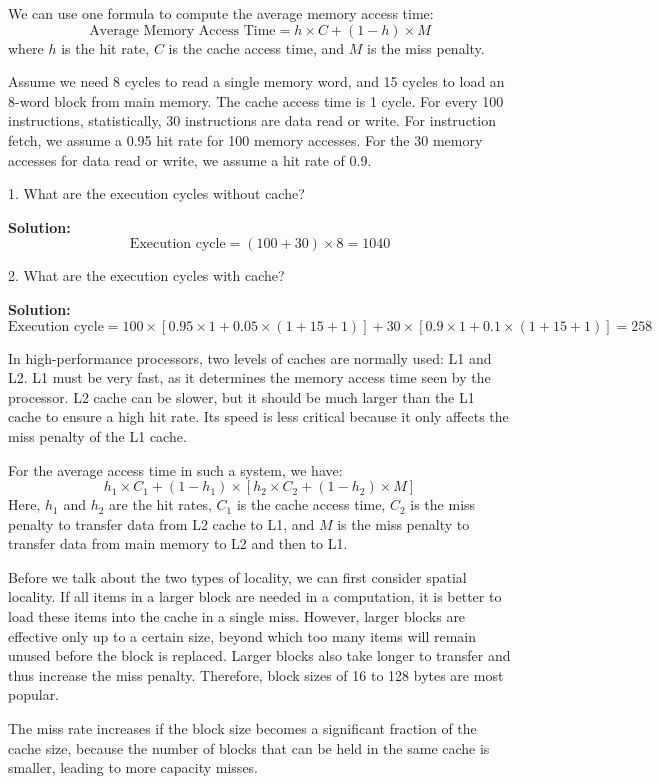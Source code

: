 We can use one formula to compute the average memory access time:
\[
\text{Average Memory Access Time} = h \times C + (1 - h) \times M
\]
where \(h\) is the hit rate, \(C\) is the cache access time, and \(M\) is the miss penalty.

\begin{eg}
Assume we need 8 cycles to read a single memory word, and 15 cycles to load an 8-word block from main memory. The cache access time is 1 cycle. For every 100 instructions, statistically, 30 instructions are data read or write. For instruction fetch, we assume a 0.95 hit rate for 100 memory accesses. For the 30 memory accesses for data read or write, we assume a hit rate of 0.9.

1. What are the execution cycles without cache?

\textbf{Solution:} 
\[
  \text{Execution cycle} = (100 + 30) \times 8 = 1040
\]

2. What are the execution cycles with cache?

\textbf{Solution:} 
\[
  \text{Execution cycle} = 100 \times [0.95 \times 1 + 0.05 \times (1 + 15 + 1)] + 30 \times [0.9 \times 1 + 0.1 \times (1 + 15 + 1)] = 258
\]  
\end{eg}

In high-performance processors, two levels of caches are normally used: L1 and L2. L1 must be very fast, as it determines the memory access time seen by the processor. L2 cache can be slower, but it should be much larger than the L1 cache to ensure a high hit rate. Its speed is less critical because it only affects the miss penalty of the L1 cache.

For the average access time in such a system, we have:
\[
  h_1 \times C_1 + (1 - h_1) \times \left[h_2 \times C_2 + (1 - h_2) \times M \right]
\]
Here, \(h_1\) and \(h_2\) are the hit rates, \(C_1\) is the cache access time, \(C_2\) is the miss penalty to transfer data from L2 cache to L1, and \(M\) is the miss penalty to transfer data from main memory to L2 and then to L1.

Before we talk about the two types of locality, we can first consider spatial locality. If all items in a larger block are needed in a computation, it is better to load these items into the cache in a single miss. However, larger blocks are effective only up to a certain size, beyond which too many items will remain unused before the block is replaced. Larger blocks also take longer to transfer and thus increase the miss penalty. Therefore, block sizes of 16 to 128 bytes are most popular.

The miss rate increases if the block size becomes a significant fraction of the cache size, because the number of blocks that can be held in the same cache is smaller, leading to more capacity misses.
